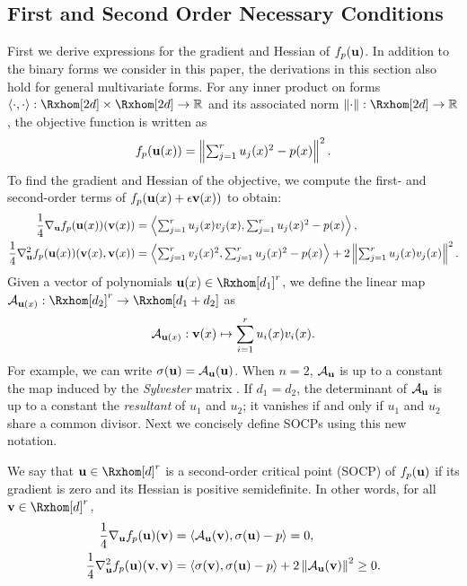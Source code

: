 \documentclass[final,onefignum,onetabnum]{siamart220329}
\begin{document}
\subsection{First and Second Order Necessary Conditions}
\label{sec:socp-conditions}
First we derive expressions for the gradient and Hessian of $f_p(\boldsymbol{\mathbf{u}})$.  In
addition to the binary forms we consider in this paper, the derivations in this
section also hold for general multivariate forms. For any inner product on forms
$\dotp{\cdot, \cdot}: \Rxhom[2d] \times \Rxhom[2d] \rightarrow \R$ and its
associated norm $\norm{\cdot}: \Rxhom[2d] \rightarrow \R$, the objective
function is written as
\begin{align*}
  \textstyle
  f_p(\boldsymbol{\mathbf{u}}(x)) = \left\lVert \sum_{j=1}^r u_j(x)^2 - p(x) \right\lVert^2.
\end{align*}
To find the gradient and Hessian of the objective, we compute the first- and
second-order terms of $f_p(\boldsymbol{\mathbf{u}}(x) + \epsilon \boldsymbol{\mathbf{v}}(x))$ to obtain:
\begin{align}
  \label{eq:grad}
  \frac{1}{4}\nabla_{\boldsymbol{\mathbf{u}}} f_p(\boldsymbol{\mathbf{u}}(x))(\boldsymbol{\mathbf{v}}(x))
  &= \left\langle {\textstyle \sum_{j=1}^r u_j(x)v_j(x)}, \textstyle \sum_{j=1}^r u_j(x)^2 - p(x) \right\rangle, \\
  \label{eq:hess}
  \frac{1}{4}\nabla_{\boldsymbol{\mathbf{u}}}^2 f_p(\boldsymbol{\mathbf{u}}(x))(\boldsymbol{\mathbf{v}}(x), \boldsymbol{\mathbf{v}}(x))
  &= \left\langle \textstyle \sum_{j=1}^r v_j(x)^2, \textstyle \sum_{j=1}^r u_j(x)^2 - p(x) \right\rangle
    + 2\left\lVert \textstyle \sum_{j=1}^r u_j(x)v_j(x) \right\lVert^2.
\end{align}
Given a vector of polynomials $\vecpoly{u} \in \Rxhom[d_1]^r$, we define the
linear map $\Au: \Rxhom[d_2]^r \to \Rxhom[d_1+d_2]$ as
\begin{align*}
  \mathcal{A}_{\boldsymbol{\mathbf{u}}(x)}: \boldsymbol{\mathbf{v}}(x) \mapsto \sum_{i=1}^r u_i(x) v_i(x).
\end{align*}
For example, we can write $\sigma(\boldsymbol{\mathbf{u}}) = \mathcal{A}_{\boldsymbol{\mathbf{u}}}(\boldsymbol{\mathbf{u}})$. When $n=2$,
$\mathcal{A}_{\boldsymbol{\mathbf{u}}}$ is up to a constant the map induced by the \emph{Sylvester} matrix
\cite{sturmfels2002solving}. If $d_1 = d_2$, the determinant of $\mathcal{A}_{\boldsymbol{\mathbf{u}}}$
is up to a constant the \emph{resultant} of $u_1$ and $u_2$; it vanishes if and
only if $u_1$ and $u_2$ share a common divisor. Next we concisely define SOCPs
using this new notation.
\begin{definition}\label{def:socp}
  We say that $\vecp{u} \in \Rxhom[d]^r$ is a second-order critical point (SOCP)
  of $f_p(\boldsymbol{\mathbf{u}})$ if its gradient is zero and its Hessian is positive
  semidefinite. In other words, for all $\vecp{v} \in \Rxhom[d]^r$,
  \begin{align}
    \label{eq:gradA}
    \frac{1}{4}\nabla_{\boldsymbol{\mathbf{u}}} f_p(\boldsymbol{\mathbf{u}})(\boldsymbol{\mathbf{v}})
    &= \left\langle \mathcal{A}_{\boldsymbol{\mathbf{u}}}(\boldsymbol{\mathbf{v}}), \sigma(\boldsymbol{\mathbf{u}}) - p \right\rangle = 0, \\
    \label{eq:hessA}
    \frac{1}{4}\nabla_{\boldsymbol{\mathbf{u}}}^2 f_p(\boldsymbol{\mathbf{u}})(\boldsymbol{\mathbf{v}}, \boldsymbol{\mathbf{v}})
    &= \left\langle \sigma(\boldsymbol{\mathbf{v}}), \sigma(\boldsymbol{\mathbf{u}}) - p \right\rangle + 2\left\lVert \mathcal{A}_{\boldsymbol{\mathbf{u}}}(\boldsymbol{\mathbf{v}}) \right\lVert^2 \ge 0.
  \end{align}
\end{definition}
\end{document}
